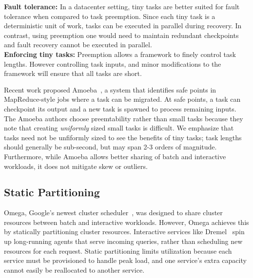 \textbf{Fault tolerance:} In a datacenter setting, tiny tasks are better suited for
fault tolerance when compared to task preemption. Since each tiny task is a
deterministic unit of work, tasks can be executed in parallel during recovery.
In contrast, using preemption one would need to maintain redundant checkpoints
and fault recovery cannot be executed in parallel. \\

\textbf{Enforcing tiny tasks:} Preemption allows a framework to finely control
task lengths. However controlling task inputs, and minor modifications to the 
framework will ensure that all tasks are short.

Recent work proposed Amoeba~\cite{ananthanarayanan2012true}, a system that identifies safe points in MapReduce-style
jobs where a task can be migrated. At safe points, a task can checkpoint its
output and a new task is spawned to process remaining inputs. The Amoeba authors
choose preemtability rather than small tasks because they note that creating
\emph{uniformly} sized small tasks is difficult. We emphasize that tasks need
not be unfiformly sized to see the benefits of tiny tasks; task lengths
should generally be sub-second, but may span 2-3 orders of magnitude.
Furthermore, while Amoeba allows better sharing of batch and interactive
workloads, it does not mitigate skew or outliers.

\subsection{Static Partitioning}
Omega, Google's newest cluster scheduler~\cite{melnik2010dremel},
was designed to share cluster
resources between batch and interactive workloads. However, Omega achieves
this by
statically partitioning cluster resources.  
Interactive services like Dremel~\cite{melnik2010dremel} spin up long-running
agents that serve incoming queries, rather than scheduling new resources for
each request.  Static partitioning limits utilization because each service
must be provisioned to handle peak load, and one service's extra capacity
cannot easily be reallocated to another service.

